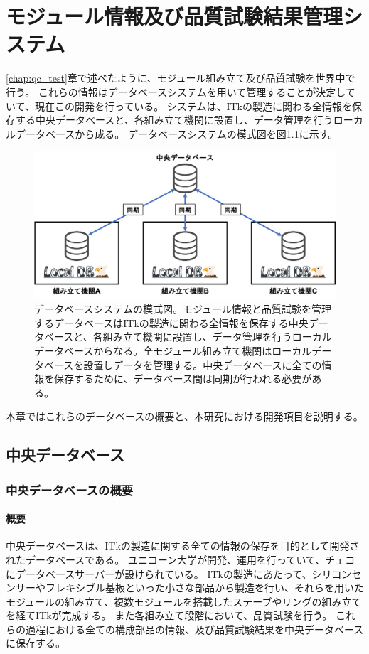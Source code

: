 \chapter{モジュール情報及び品質試験結果管理システム}\label{chap:dbsystem}
\ref{chap:qc_test}章で述べたように、モジュール組み立て及び品質試験を世界中で行う。
これらの情報はデータベースシステムを用いて管理することが決定していて、現在この開発を行っている。
システムは、ITkの製造に関わる全情報を保存する中央データベースと、各組み立て機関に設置し、データ管理を行うローカルデータベースから成る。
データベースシステムの模式図を図\ref{database_overview}に示す。

\begin{figure}[bpt]\centering
\includegraphics[width=12cm]{./database_overview.png}
\caption[データベースシステムの模式図]{データベースシステムの模式図。モジュール情報と品質試験を管理するデータベースはITkの製造に関わる全情報を保存する中央データベースと、各組み立て機関に設置し、データ管理を行うローカルデータベースからなる。全モジュール組み立て機関はローカルデータベースを設置しデータを管理する。中央データベースに全ての情報を保存するために、データベース間は同期が行われる必要がある。}
\label{database_overview}
\end{figure}


本章ではこれらのデータベースの概要と、本研究における開発項目を説明する。

\section{中央データベース}
\subsection{中央データベースの概要}
\subsubsection{概要}
中央データベースは、ITkの製造に関する全ての情報の保存を目的として開発されたデータベースである。
ユニコーン大学\cite{4-9}が開発、運用を行っていて、チェコにデータベースサーバーが設けられている。
ITkの製造にあたって、シリコンセンサーやフレキシブル基板といった小さな部品から製造を行い、それらを用いたモジュールの組み立て、複数モジュールを搭載したステーブやリングの組み立てを経てITkが完成する。
また各組み立て段階において、品質試験を行う。
これらの過程における全ての構成部品の情報、及び品質試験結果を中央データベースに保存する。

